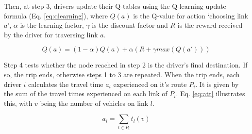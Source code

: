 \documentclass[12pt]{llncs}
\newcommand{\route}[1]{\ensuremath{P_#1}}	%
\newcommand{\travTime}{\ensuremath{t_l}} 	%
\newcommand{\veh}{\ensuremath{v}}		%
\newcommand{\att}[1]{\ensuremath{a_#1}}		%
\newcommand{\reward}[1][]{\ensuremath{R_#1}}	%
\begin{document}

Then, at step 3, drivers update their Q-tables using the Q-learning update formula (Eq. \eqref{eq:qlearning}), where $Q(a)$ is the Q-value for action `choosing link $a$', $\alpha$ is the learning factor, $\gamma$ is the discount factor and $R$ is the reward received by the driver for traversing link $a$.

\begin{equation}
\label{eq:qlearning}
Q(a) = (1 - \alpha) Q(a) + \alpha (R + \gamma max(Q(a')))
\end{equation}


Step 4 tests whether the node reached in step 2 is the driver's final destination. If so, the trip ends, otherwise steps 1 to 3 are repeated. When the trip ends, each driver $i$ calculates the travel time $\att{i}$ experienced on it's route $\route{i}$. It is given by the sum of the travel times experienced on each link of $\route{i}$. Eq. \eqref{eq:att} illustrates this, with $\veh$ being the number of vehicles on link $l$.

\begin{equation}
\label{eq:att}
\att{i} = \sum_{l \in \route{i}} \travTime(\veh)
\end{equation}



\end{document}
